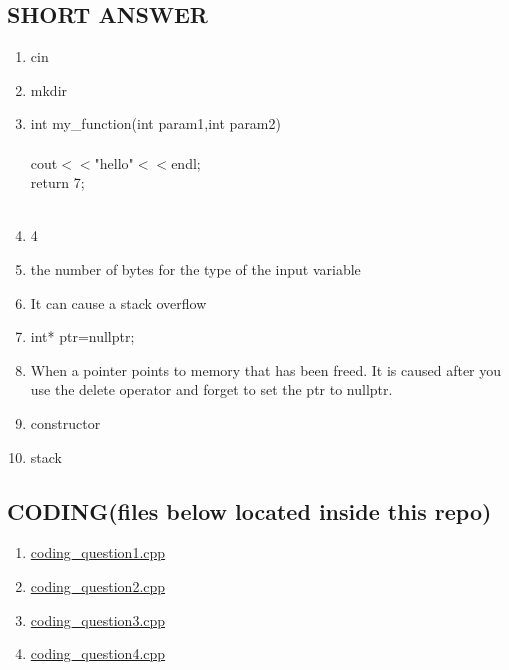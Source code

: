 \documentclass[a4paper]{article}
\begin{document}
\subsection{SHORT ANSWER}
\begin{enumerate}
    \item cin
    \item mkdir
    \item int my\_function(int param1,int param2)\\
    {\\
    cout$<<$"hello"$<<$endl;\\
    return 7;\\
    }\\
    \item 4
    \item the number of bytes for the type of the input variable
    \item It can cause a stack overflow
    \item int* ptr=nullptr;
    \item When a pointer points to memory that has been freed. It is caused after
          you use the delete operator and forget to set the ptr to nullptr.
    \item constructor
    \item stack
\end{enumerate}

\subsection{CODING(files below located inside this repo)}
\begin{enumerate}
    \item \href{run:./coding_question1.cpp}{coding\_question1.cpp}
    \item \href{run:./coding_question2.cpp}{coding\_question2.cpp}
    \item \href{run:./coding_question3.cpp}{coding\_question3.cpp}
    \item \href{run:./coding_question4.cpp}{coding\_question4.cpp}
\end{enumerate}
\end{document}
